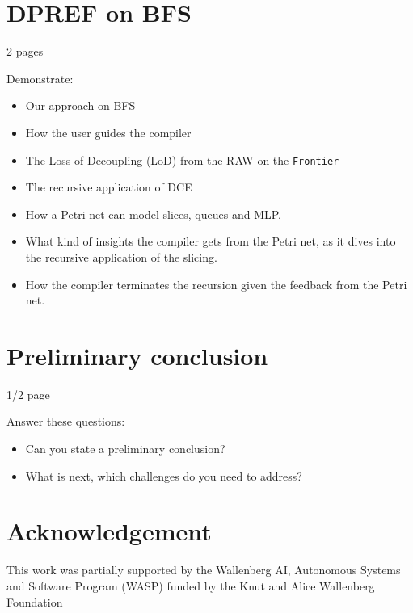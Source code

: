 \documentclass{acaces}
\begin{document}
\section{DPREF on BFS} 

2 pages

Demonstrate:
\begin{itemize}
\item Our approach on BFS
\item How the user guides the compiler
\item The Loss of Decoupling (LoD) \cite{bird_effectiveness_1993} from the RAW on the \texttt{Frontier}
\item The recursive application of DCE
\item How a Petri net can model slices, queues and MLP.
\item What kind of insights the compiler gets from the Petri net, as it dives into the recursive application of the slicing.
\item How the compiler terminates the recursion given the feedback from the Petri net.
\end{itemize}

\section{Preliminary conclusion}

1/2 page

Answer these questions:
\begin{itemize}
\item Can you state a preliminary conclusion?
\item What is next, which challenges do you need to address?
\end{itemize}


\section{Acknowledgement}

This work was partially supported by the Wallenberg AI, Autonomous Systems and Software Program (WASP)
funded by the Knut and Alice Wallenberg Foundation


\end{document}
